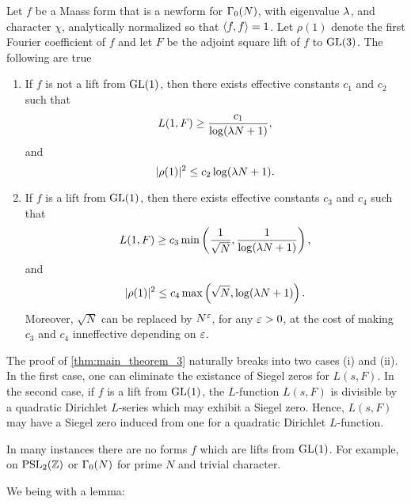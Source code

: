 \documentclass[12pt,reqno,oneside]{amsart}
\begin{document}
    \begin{theorem}\label{thm:main_theorem_3}
        Let $f$ be a Maass form that is a newform for $\Gamma_{0}(N)$, with eigenvalue $\lambda$, and character $\chi$, analytically normalized so that $\langle f,f\rangle = 1$. Let $\rho(1)$ denote the first Fourier coefficient of $f$ and let $F$ be the adjoint square lift of $f$ to $\mathrm{GL}(3)$. The following are true
        \begin{enumerate}[label=(\roman*)]
            \item If $f$ is not a lift from $\mathrm{GL}(1)$, then there exists effective constants $c_{1}$ and $c_{2}$ such that
            \[
                L(1,F) \ge \frac{c_{1}}{\log(\lambda N+1)},
            \]
            and
            \[
                |\rho(1)|^{2} \le c_{2}\log(\lambda N+1).
            \]
            \item If $f$ is a lift from $\mathrm{GL}(1)$, then there exists effective constants $c_{3}$ and $c_{4}$ such that
            \[
                L(1,F) \ge c_{3}\min\left(\frac{1}{\sqrt{N}},\frac{1}{\log(\lambda N+1)}\right),
            \]
            and
            \[
                |\rho(1)|^{2} \le c_{4}\max\left(\sqrt{N},\log(\lambda N+1)\right).
            \]
            Moreover, $\sqrt{N}$ can be replaced by $N^{\varepsilon}$, for any $\varepsilon > 0$, at the cost of making $c_{3}$ and $c_{4}$ inneffective depending on $\varepsilon$.
        \end{enumerate}
    \end{theorem}

    The proof of \cref{thm:main_theorem_3} naturally breaks into two cases (i) and (ii). In the first case, one can eliminate the existance of Siegel zeros for $L(s,F)$. In the second case, if $f$ is a lift from $\mathrm{GL}(1)$, the $L$-function $L(s,F)$ is divisible by a quadratic Dirichlet $L$-series which may exhibit a Siegel zero. Hence, $L(s,F)$ may have a Siegel zero induced from one for a quadratic Dirichlet $L$-function.

    \begin{remark}
        In many instances there are no forms $f$ which are lifts from $\mathrm{GL}(1)$. For example, on $\mathrm{PSL}_{2}(\mathbb{Z})$ or $\Gamma_{0}(N)$ for prime $N$ and trivial character.
    \end{remark}

    We being with a lemma:
\end{document}
